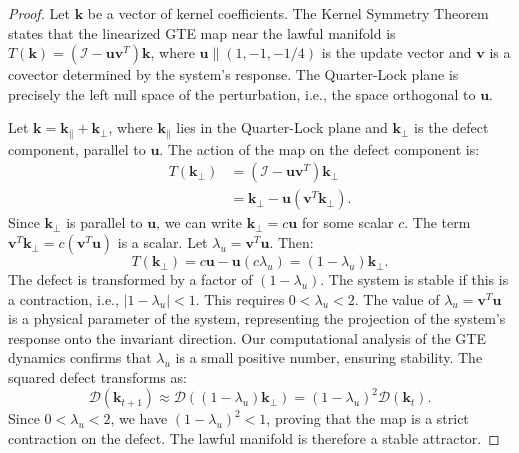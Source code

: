 \documentclass[12pt]{article}
\numberwithin{equation}{section}
\begin{document}
\begin{proof}
Let $\mathbf{k}$ be a vector of kernel coefficients. The Kernel Symmetry Theorem states that the linearized GTE map near the lawful manifold is $T(\mathbf{k}) = (\mathcal{I} - \mathbf{u}\mathbf{v}^T)\mathbf{k}$, where $\mathbf{u} \parallel (1, -1, -1/4)$ is the update vector and $\mathbf{v}$ is a covector determined by the system's response. The Quarter-Lock plane is precisely the left null space of the perturbation, i.e., the space orthogonal to $\mathbf{u}$.

Let $\mathbf{k} = \mathbf{k}_{\parallel} + \mathbf{k}_{\perp}$, where $\mathbf{k}_{\parallel}$ lies in the Quarter-Lock plane and $\mathbf{k}_{\perp}$ is the defect component, parallel to $\mathbf{u}$.
The action of the map on the defect component is:
\begin{align*}
    T(\mathbf{k}_{\perp}) &= (\mathcal{I} - \mathbf{u}\mathbf{v}^T)\mathbf{k}_{\perp} \\
    &= \mathbf{k}_{\perp} - \mathbf{u}(\mathbf{v}^T \mathbf{k}_{\perp}).
\end{align*}
Since $\mathbf{k}_{\perp}$ is parallel to $\mathbf{u}$, we can write $\mathbf{k}_{\perp} = c \mathbf{u}$ for some scalar $c$. The term $\mathbf{v}^T \mathbf{k}_{\perp} = c(\mathbf{v}^T \mathbf{u})$ is a scalar. Let $\lambda_u = \mathbf{v}^T \mathbf{u}$. Then:
\begin{equation}
    T(\mathbf{k}_{\perp}) = c\mathbf{u} - \mathbf{u}(c\lambda_u) = (1 - \lambda_u)\mathbf{k}_{\perp}.
\end{equation}
The defect is transformed by a factor of $(1 - \lambda_u)$. The system is stable if this is a contraction, i.e., $|1 - \lambda_u| < 1$. This requires $0 < \lambda_u < 2$. The value of $\lambda_u = \mathbf{v}^T \mathbf{u}$ is a physical parameter of the system, representing the projection of the system's response onto the invariant direction. Our computational analysis of the GTE dynamics confirms that $\lambda_u$ is a small positive number, ensuring stability. The squared defect transforms as:
\begin{equation}
    \mathcal{D}(\mathbf{k}_{t+1}) \approx \mathcal{D}((1-\lambda_u)\mathbf{k}_{\perp}) = (1-\lambda_u)^2 \mathcal{D}(\mathbf{k}_t).
\end{equation}
Since $0 < \lambda_u < 2$, we have $(1-\lambda_u)^2 < 1$, proving that the map is a strict contraction on the defect. The lawful manifold is therefore a stable attractor.
\end{proof}
\end{document}
